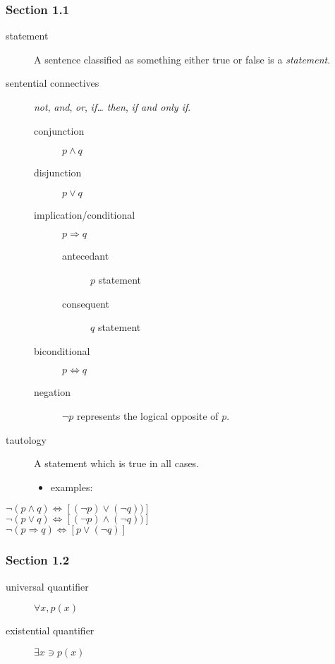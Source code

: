 \documentclass[12pt]{article}
\begin{document}
\subsubsection{Section 1.1}
\label{sec:org98d475a}
\begin{description}
\item[{statement}] A sentence classified as something either true or false is a
\emph{statement}.
\item[{sentential connectives}] \emph{not}, \emph{and}, \emph{or}, \emph{if\dots{} then}, \emph{if and only if}.
\begin{description}
\item[{conjunction}] \(p\land{}q\)
\item[{disjunction}] \(p\lor{}q\)
\item[{implication/conditional}] \(p\Rightarrow{}q\)
\begin{description}
\item[{antecedant}] \(p\) statement
\item[{consequent}] \(q\) statement
\end{description}
\item[{biconditional}] \(p\Leftrightarrow{}q\)
\item[{negation}] \(\neg{}p\) represents the logical opposite of \(p\).
\end{description}
\item[{tautology}] A statement which is true in all cases.
\begin{itemize}
\item examples:
\end{itemize}
\end{description}
\begin{center}
\(\neg(p\land{}q)\Leftrightarrow[(\neg{}p)\lor(\neg{}q))]\) \\
\(\neg(p\lor{}q)\Leftrightarrow[(\neg{}p)\land(\neg{}q))]\) \\
\(\neg(p\Rightarrow{}q)\Leftrightarrow[p\lor(\neg{}q)]\) \\
\end{center}

\subsubsection{Section 1.2}
\label{sec:orge97f605}
\begin{description}
\item[{universal quantifier}] \(\forall{}x,p(x)\)
\item[{existential quantifier}] \(\exists{}x\ni{}p(x)\)
\end{description}
\end{document}

